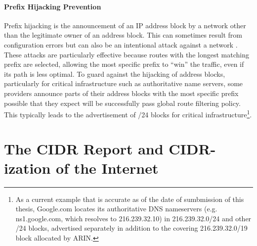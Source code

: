 
\paragraph{Prefix Hijacking Prevention}

Prefix hijacking is the announcement of an IP address block by a network other than the legitimate owner of an address block. This can sometimes result from configuration errors \cite{Brown:2008hc} but can also be an intentional attack against a network \cite{Pilosov:2008ij}. These attacks are particularly effective because routes with the longest matching prefix are selected, allowing the most specific prefix to ``win'' the traffic, even if its path is less optimal. To guard against the hijacking of address blocks, particularly for critical infrastructure such as authoritative name servers, some providers announce parts of their address blocks with the most specific prefix possible that they expect will be successfully pass global route filtering policy. This typically leads to the advertisement of /24 blocks for critical infrastructure\footnote{As a current example that is accurate as of the date of sumbmission of this thesis, Google.com locates its authoritative DNS nameservers (e.g. ns1.google.com, which resolves to 216.239.32.10) in 216.239.32.0/24 and other /24 blocks, advertised separately in addition to the covering 216.239.32.0/19 block allocated by ARIN.}.

%
%
%

\section{The CIDR Report and CIDR-ization of the Internet}

